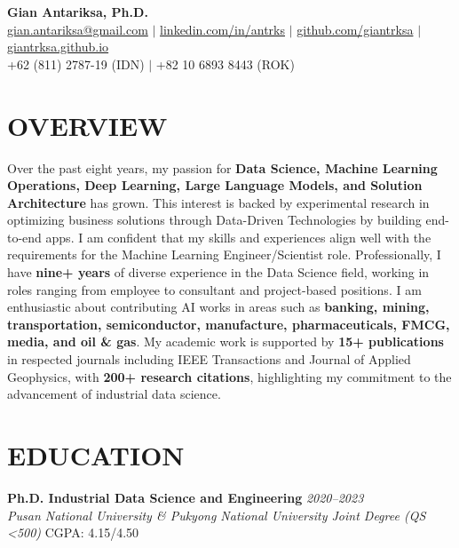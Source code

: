 \documentclass[10pt,a4paper]{article}
\newcommand{\education}[4]{%
    \noindent\textbf{#1} \hfill \textit{#2}\\
    \textit{#3} \hfill #4\vspace{2pt}
}
\begin{document}
\begin{center}
    {\Huge\bfseries\color{primary} Gian Antariksa, Ph.D.}\\[3pt]
    \href{mailto:gian.antariksa@gmail.com}{gian.antariksa@gmail.com} $\mid$ 
    \href{https://linkedin.com/in/antrks}{linkedin.com/in/antrks} $\mid$ 
    \href{https://github.com/giantrksa}{github.com/giantrksa} $\mid$
    \href{https://giantrksa.github.io}{giantrksa.github.io}\\
    +62 (811) 2787-19 (IDN) $\mid$ +82 10 6893 8443 (ROK)
\end{center}

\vspace{-2pt}

\section*{OVERVIEW}
\vspace{-2pt}
Over the past eight years, my passion for \textbf{Data Science, Machine Learning Operations, Deep Learning, Large Language Models, and Solution Architecture} has grown. This interest is backed by experimental research in optimizing business solutions through Data-Driven Technologies by building end-to-end apps. I am confident that my skills and experiences align well with the requirements for the Machine Learning Engineer/Scientist role. Professionally, I have \textbf{nine+ years} of diverse experience in the Data Science field, working in roles ranging from employee to consultant and project-based positions. I am enthusiastic about contributing AI works in areas such as \textbf{banking, mining, transportation, semiconductor, manufacture, pharmaceuticals, FMCG, media, and oil \& gas}. My academic work is supported by \textbf{15+ publications} in respected journals including IEEE Transactions and Journal of Applied Geophysics, with \textbf{200+ research citations}, highlighting my commitment to the advancement of industrial data science.

\vspace{2pt}

\section*{EDUCATION}

\education{Ph.D. Industrial Data Science and Engineering}{2020--2023}{Pusan National University \& Pukyong National University Joint Degree (QS <500)}{CGPA: 4.15/4.50}
\end{document}

